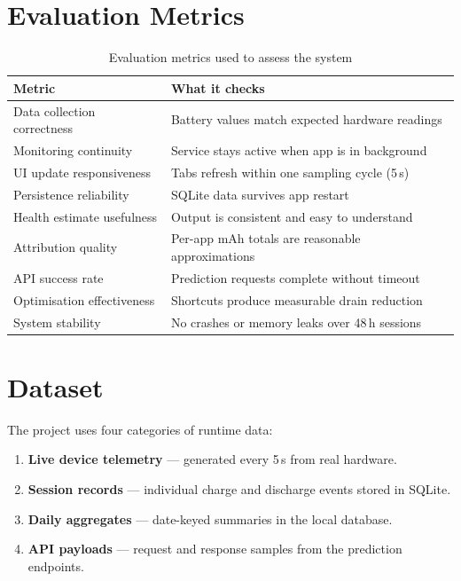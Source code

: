 \documentclass[12pt,a4paper]{report}
\begin{document}
\section{Evaluation Metrics}

\begin{table}[H]
\caption{Evaluation metrics used to assess the system}
\centering
\small
\begin{tabular}{ll}
\toprule
\textbf{Metric} & \textbf{What it checks}\\
\midrule
Data collection correctness  & Battery values match expected hardware readings\\
Monitoring continuity        & Service stays active when app is in background\\
UI update responsiveness     & Tabs refresh within one sampling cycle (5\,s)\\
Persistence reliability      & SQLite data survives app restart\\
Health estimate usefulness   & Output is consistent and easy to understand\\
Attribution quality          & Per-app mAh totals are reasonable approximations\\
API success rate             & Prediction requests complete without timeout\\
Optimisation effectiveness   & Shortcuts produce measurable drain reduction\\
System stability             & No crashes or memory leaks over 48\,h sessions\\
\bottomrule
\end{tabular}
\end{table}

\section{Dataset}

The project uses four categories of runtime data:

\begin{enumerate}
  \item \textbf{Live device telemetry} — generated every 5\,s from real hardware.
  \item \textbf{Session records} — individual charge and discharge events stored
        in SQLite.
  \item \textbf{Daily aggregates} — date-keyed summaries in the local database.
  \item \textbf{API payloads} — request and response samples from the prediction
        endpoints.
\end{enumerate}
\end{document}
